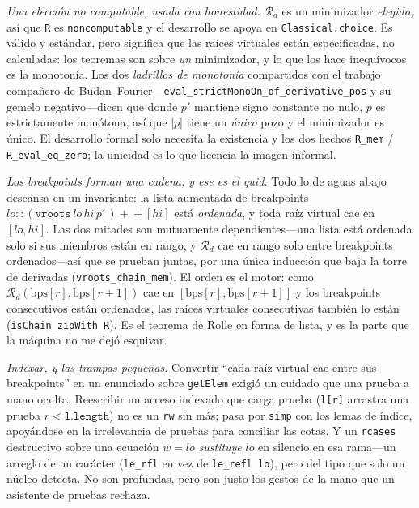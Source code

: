 \documentclass[11pt]{article}
\newcommand{\lean}[1]{\texttt{#1}}
\newcommand{\Rd}{\mathcal{R}}
\begin{document}
\emph{Una elecci\'on no computable, usada con honestidad.} $\Rd_d$ es un minimizador \emph{elegido},
as\'i que \lean{R} es \lean{noncomputable} y el desarrollo se apoya en \lean{Classical.choice}. Es
v\'alido y est\'andar, pero significa que las ra\'ices virtuales est\'an especificadas, no calculadas:
los teoremas son sobre \emph{un} minimizador, y lo que los hace inequ\'ivocos es la monoton\'ia. Los
dos \emph{ladrillos de monoton\'ia} compartidos con el trabajo compa\~nero de
Budan--Fourier---\lean{eval\_strictMonoOn\_of\_derivative\_pos} y su gemelo negativo---dicen que donde
$p'$ mantiene signo constante no nulo, $p$ es estrictamente mon\'otona, as\'i que $|p|$ tiene un
\emph{\'unico} pozo y el minimizador es \'unico. El desarrollo formal solo necesita la existencia y los
dos hechos \lean{R\_mem} / \lean{R\_eval\_eq\_zero}; la unicidad es lo que licencia la imagen informal.

\emph{Los breakpoints forman una cadena, y ese es el quid.} Todo lo de aguas abajo descansa en un
invariante: la lista aumentada de breakpoints $lo::(\lean{vroots}\,lo\,hi\,p'\,)+\!\!+[hi]$ est\'a
\emph{ordenada}, y toda ra\'iz virtual cae en $[lo,hi]$. Las dos mitades son mutuamente
dependientes---una lista est\'a ordenada solo si sus miembros est\'an en rango, y $\Rd_d$ cae en rango
solo entre breakpoints ordenados---as\'i que se prueban juntas, por una \'unica inducci\'on que baja la
torre de derivadas (\lean{vroots\_chain\_mem}). El orden es el motor: como
$\Rd_d(\mathrm{bps}[r],\mathrm{bps}[r+1])$ cae en $[\mathrm{bps}[r],\mathrm{bps}[r+1]]$ y los
breakpoints consecutivos est\'an ordenados, las ra\'ices virtuales consecutivas tambi\'en lo est\'an
(\lean{isChain\_zipWith\_R}). Es el teorema de Rolle en forma de lista, y es la parte que la m\'aquina
no me dej\'o esquivar.

\emph{Indexar, y las trampas peque\~nas.} Convertir ``cada ra\'iz virtual cae entre sus breakpoints''
en un enunciado sobre \lean{getElem} exigi\'o un cuidado que una prueba a mano oculta. Reescribir un
acceso indexado que carga prueba (\lean{l[r]} arrastra una prueba $r<\lean{l.length}$) no es un
\lean{rw} sin m\'as; pasa por \lean{simp} con los lemas de \'indice, apoy\'andose en la irrelevancia de
pruebas para conciliar las cotas. Y un \lean{rcases} destructivo sobre una ecuaci\'on $w=lo$
\emph{sustituye} $lo$ en silencio en esa rama---un arreglo de un car\'acter (\lean{le\_rfl} en vez de
\lean{le\_refl lo}), pero del tipo que solo un n\'ucleo detecta. No son profundas, pero son justo los
gestos de la mano que un asistente de pruebas rechaza.
\end{document}
